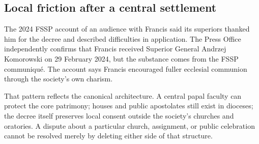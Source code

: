 \subsection{Local friction after a central settlement}

The 2024 FSSP account of an audience with Francis said its superiors thanked him for the decree and described difficulties in application. The Press Office independently confirms that Francis received Superior General Andrzej Komorowski on 29 February 2024, but the substance comes from the FSSP communiqué. The account says Francis encouraged fuller ecclesial communion through the society's own charism.

That pattern reflects the canonical architecture. A central papal faculty can protect the core patrimony; houses and public apostolates still exist in dioceses; the decree itself preserves local consent outside the society's churches and oratories. A dispute about a particular church, assignment, or public celebration cannot be resolved merely by deleting either side of that structure.

